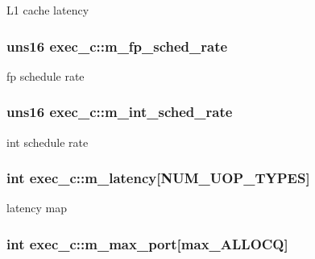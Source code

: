 \label{classexec__c_a3f279061192ac53468378460f26ced72}
L1 cache latency \hypertarget{classexec__c_a26d03df823d4bcf60b1244e643057e3f}{
\subsubsection[{m\_\-fp\_\-sched\_\-rate}]{\setlength{\rightskip}{0pt plus 5cm}uns16 {\bf exec\_\-c::m\_\-fp\_\-sched\_\-rate}}}
\label{classexec__c_a26d03df823d4bcf60b1244e643057e3f}
fp schedule rate \hypertarget{classexec__c_a32b6e3cad16804285c38abc1a1395d4a}{
\subsubsection[{m\_\-int\_\-sched\_\-rate}]{\setlength{\rightskip}{0pt plus 5cm}uns16 {\bf exec\_\-c::m\_\-int\_\-sched\_\-rate}}}
\label{classexec__c_a32b6e3cad16804285c38abc1a1395d4a}
int schedule rate \hypertarget{classexec__c_a277fba431c3f7790642e3546ebd5ff12}{
\subsubsection[{m\_\-latency}]{\setlength{\rightskip}{0pt plus 5cm}int {\bf exec\_\-c::m\_\-latency}\mbox{[}NUM\_\-UOP\_\-TYPES\mbox{]}}}
\label{classexec__c_a277fba431c3f7790642e3546ebd5ff12}
latency map \hypertarget{classexec__c_a386a95a928d3cbbd4e3b341fc126a221}{
\subsubsection[{m\_\-max\_\-port}]{\setlength{\rightskip}{0pt plus 5cm}int {\bf exec\_\-c::m\_\-max\_\-port}\mbox{[}max\_\-ALLOCQ\mbox{]}}}
